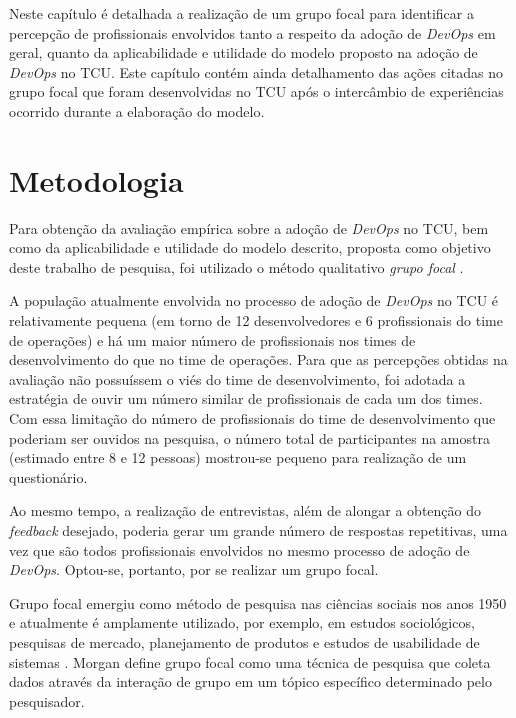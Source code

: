 Neste capítulo é detalhada a realização de um grupo focal \cite{focus_group_handbook,shull2007guide}
para identificar a percepção de profissionais envolvidos tanto a respeito da
adoção de {\it DevOps} em geral, quanto da aplicabilidade e utilidade do modelo
proposto na adoção de {\it DevOps} no \acrshort{TCU}. Este capítulo contém ainda
detalhamento das ações citadas no grupo focal que foram desenvolvidas no \acrshort{TCU}
após o intercâmbio de experiências ocorrido durante a elaboração do modelo.

\section{Metodologia}

Para obtenção da avaliação empírica sobre a adoção de {\it DevOps} no \acrshort{TCU},
bem como da aplicabilidade e utilidade do modelo descrito, proposta como
objetivo deste trabalho de pesquisa, foi utilizado o método qualitativo
\emph{grupo focal} \cite{focus_group_handbook}.

A população atualmente envolvida no processo de adoção de \textit{DevOps} no TCU é
relativamente pequena (em torno de 12 desenvolvedores e 6 profissionais do time
de operações) e há um maior número de profissionais nos times de
desenvolvimento do que no time de operações. Para que as percepções obtidas
na avaliação não possuíssem o viés do time de desenvolvimento, foi adotada a
estratégia de ouvir um número similar de profissionais de cada um dos times.
Com essa limitação do número de profissionais do time de desenvolvimento que
poderiam ser ouvidos na pesquisa, o número total de participantes na amostra
(estimado entre 8 e 12 pessoas) mostrou-se pequeno para realização de um
questionário.

Ao mesmo tempo, a realização de entrevistas, além de alongar a obtenção do
\textit{feedback} desejado, poderia gerar um grande número de respostas
repetitivas, uma vez que são todos profissionais envolvidos no mesmo processo
de adoção de \textit{DevOps}. Optou-se, portanto, por se realizar um grupo
focal.

Grupo focal emergiu como método de pesquisa nas ciências sociais nos anos 1950
e atualmente é amplamente utilizado, por exemplo, em estudos sociológicos,
pesquisas de mercado, planejamento de produtos e estudos de usabilidade de
sistemas \cite{shull2007guide}. Morgan \cite{morgan1996focus} define grupo focal
como uma técnica de pesquisa que coleta dados através da interação de grupo em
um tópico específico determinado pelo pesquisador.


